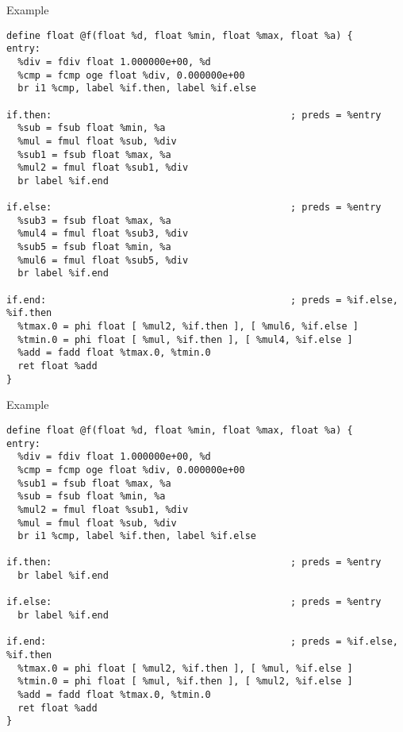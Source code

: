 \documentclass{beamer}
\begin{document}

\newlength\someheight
\setlength\someheight{4cm}

\begin{frame}[fragile]{Example}
\begin{adjustbox}{width=\textwidth,height=\someheight,keepaspectratio}
\begin{lstlisting}
define float @f(float %d, float %min, float %max, float %a) {
entry:
  %div = fdiv float 1.000000e+00, %d
  %cmp = fcmp oge float %div, 0.000000e+00
  br i1 %cmp, label %if.then, label %if.else

if.then:                                          ; preds = %entry
  %sub = fsub float %min, %a
  %mul = fmul float %sub, %div
  %sub1 = fsub float %max, %a
  %mul2 = fmul float %sub1, %div
  br label %if.end

if.else:                                          ; preds = %entry
  %sub3 = fsub float %max, %a
  %mul4 = fmul float %sub3, %div
  %sub5 = fsub float %min, %a
  %mul6 = fmul float %sub5, %div
  br label %if.end

if.end:                                           ; preds = %if.else, %if.then
  %tmax.0 = phi float [ %mul2, %if.then ], [ %mul6, %if.else ]
  %tmin.0 = phi float [ %mul, %if.then ], [ %mul4, %if.else ]
  %add = fadd float %tmax.0, %tmin.0
  ret float %add
}
\end{lstlisting}
\end{adjustbox}
\end{frame}

\begin{frame}[fragile]{Example}
\begin{adjustbox}{width=\textwidth,height=\someheight,keepaspectratio}
\begin{lstlisting}
define float @f(float %d, float %min, float %max, float %a) {
entry:
  %div = fdiv float 1.000000e+00, %d
  %cmp = fcmp oge float %div, 0.000000e+00
  %sub1 = fsub float %max, %a
  %sub = fsub float %min, %a
  %mul2 = fmul float %sub1, %div
  %mul = fmul float %sub, %div
  br i1 %cmp, label %if.then, label %if.else

if.then:                                          ; preds = %entry
  br label %if.end

if.else:                                          ; preds = %entry
  br label %if.end

if.end:                                           ; preds = %if.else, %if.then
  %tmax.0 = phi float [ %mul2, %if.then ], [ %mul, %if.else ]
  %tmin.0 = phi float [ %mul, %if.then ], [ %mul2, %if.else ]
  %add = fadd float %tmax.0, %tmin.0
  ret float %add
}
\end{lstlisting}
\end{adjustbox}
\end{frame}
\end{document}
